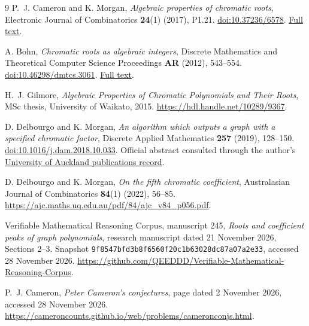 \documentclass[11pt,a4paper]{article}
\theoremstyle{definition}
\begin{document}
\begin{thebibliography}{9}
P.~J. Cameron and K. Morgan,
\emph{Algebraic properties of chromatic roots},
Electronic Journal of Combinatorics \textbf{24}(1) (2017), P1.21.
\href{https://doi.org/10.37236/6578}{doi:10.37236/6578}.
\href{https://emis.de/ft/29131}{Full text}.

A. Bohn, \emph{Chromatic roots as algebraic integers},
Discrete Mathematics and Theoretical Computer Science Proceedings
\textbf{AR} (2012), 543--554.
\href{https://doi.org/10.46298/dmtcs.3061}{doi:10.46298/dmtcs.3061}.
\href{https://www.math.nagoya-u.ac.jp/fpsac12/download/contributed/dmAR0148.pdf}{Full text}.

H.~J. Gilmore,
\emph{Algebraic Properties of Chromatic Polynomials and Their Roots},
MSc thesis, University of Waikato, 2015.
\url{https://hdl.handle.net/10289/9367}.

D. Delbourgo and K. Morgan,
\emph{An algorithm which outputs a graph with a specified chromatic factor},
Discrete Applied Mathematics \textbf{257} (2019), 128--150.
\href{https://doi.org/10.1016/j.dam.2018.10.033}{doi:10.1016/j.dam.2018.10.033}.
Official abstract consulted through the author's
\href{https://profiles.auckland.ac.nz/daniel-delbourgo/publications}{University of Auckland publications record}.

D. Delbourgo and K. Morgan, \emph{On the fifth chromatic coefficient},
Australasian Journal of Combinatorics \textbf{84}(1) (2022), 56--85.
\url{https://ajc.maths.uq.edu.au/pdf/84/ajc_v84_p056.pdf}.

Verifiable Mathematical Reasoning Corpus, manuscript 245,
\emph{Roots and coefficient peaks of graph polynomials},
research manuscript dated 21 November 2026, Sections 2--3.
Snapshot \texttt{9f8547bfd3b8f6560f20c1b63028dc87a07a2e33},
accessed 28 November 2026.
\url{https://github.com/QEEDDD/Verifiable-Mathematical-Reasoning-Corpus}.

P.~J. Cameron, \emph{Peter Cameron's conjectures},
page dated 2 November 2026, accessed 28 November 2026.
\url{https://cameroncounts.github.io/web/problems/cameronconjs.html}.
\end{thebibliography}
\end{document}
